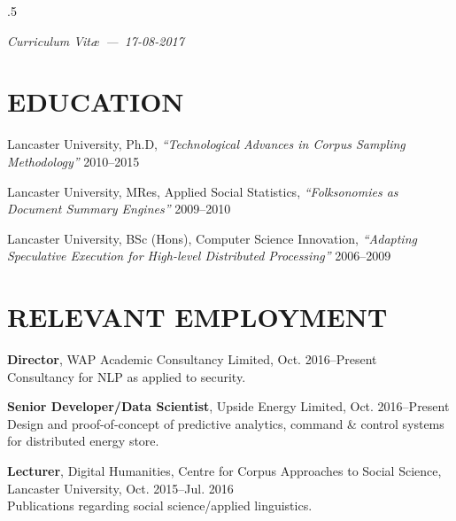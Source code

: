\documentclass{res}
\begin{document}
\thispagestyle{empty} %
\address{\\
\texttt{<steve@stephenwattam.com>}\\
\texttt{http://stephenwattam.com/}}


\begin{resume}
\vspace{0.2in}
\moveleft.5\sectionwidth\centerline{\it Curriculum Vit\ae~---~17-08-2017}

\section{EDUCATION}
\vspace{0.1in}


    Lancaster University, Ph.D,
    \textit{``Technological Advances in Corpus Sampling Methodology''}
    2010--2015

    Lancaster University, MRes,
    Applied Social Statistics,
    \textit{``Folksonomies as Document Summary \mbox{Engines}''}
    2009--2010

    Lancaster University, BSc (Hons),
    Computer Science Innovation,
    \textit{``Adapting Speculative Execution for High-level Distributed Processing''}
    2006--2009



\section{RELEVANT EMPLOYMENT}
\vspace{0.1in}

    {\bf Director},
    WAP Academic Consultancy Limited,
    Oct. 2016--Present\\ 
    Consultancy for NLP as applied to security.

    {\bf Senior Developer/Data Scientist},
    Upside Energy Limited,
    Oct. 2016--Present\\
    Design and proof-of-concept of predictive analytics, command \& control systems for distributed energy store.

    {\bf Lecturer},
    Digital Humanities, Centre for Corpus Approaches to Social Science,
    Lancaster University,
    Oct. 2015--Jul. 2016\\
    Publications regarding social science/applied linguistics.
    

\end{resume}
\end{document}
